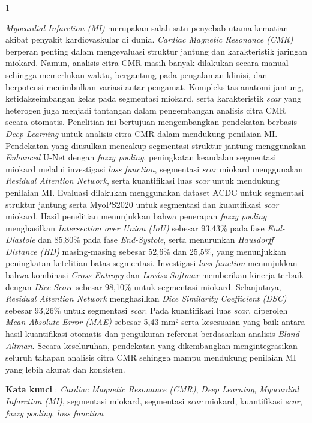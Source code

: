 \begin{spacing}{1}
	

\textit{Myocardial Infarction (MI)} merupakan salah satu penyebab utama kematian akibat penyakit kardiovaskular di dunia. \textit{Cardiac Magnetic Resonance (CMR)} berperan penting dalam mengevaluasi struktur jantung dan karakteristik jaringan miokard. Namun, analisis citra CMR masih banyak dilakukan secara manual sehingga memerlukan waktu, bergantung pada pengalaman klinisi, dan berpotensi menimbulkan variasi antar-pengamat. Kompleksitas anatomi jantung, ketidakseimbangan kelas pada segmentasi miokard, serta karakteristik \textit{scar} yang heterogen juga menjadi tantangan dalam pengembangan analisis citra CMR secara otomatis.
Penelitian ini bertujuan mengembangkan pendekatan berbasis \textit{Deep Learning} untuk analisis citra CMR dalam mendukung penilaian MI. Pendekatan yang diusulkan mencakup segmentasi struktur jantung menggunakan \textit {Enhanced} U-Net dengan \textit{fuzzy pooling}, peningkatan keandalan segmentasi miokard melalui investigasi \textit{loss function}, segmentasi \textit{scar} miokard menggunakan \textit{Residual Attention Network}, serta kuantifikasi luas \textit{scar} untuk mendukung penilaian MI. Evaluasi dilakukan menggunakan dataset ACDC untuk segmentasi struktur jantung serta MyoPS2020 untuk segmentasi dan kuantifikasi \textit{scar} miokard.
Hasil penelitian menunjukkan bahwa penerapan \textit{fuzzy pooling} menghasilkan \textit{Intersection over Union (IoU)} sebesar 93,43\% pada fase \textit{End-Diastole} dan 85,80\% pada fase \textit{End-Systole}, serta menurunkan \textit{Hausdorff Distance (HD)} masing-masing sebesar 52,6\% dan 25,5\%, yang menunjukkan peningkatan ketelitian batas segmentasi. Investigasi \textit{loss function} menunjukkan bahwa kombinasi \textit{Cross-Entropy} dan \textit{Lovász-Softmax} memberikan kinerja terbaik dengan \textit{Dice Score} sebesar 98,10\% untuk segmentasi miokard. Selanjutnya, \textit{Residual Attention Network} menghasilkan \textit{Dice Similarity Coefficient (DSC)} sebesar 93,26\% untuk segmentasi \textit{scar}. Pada kuantifikasi luas \textit{scar}, diperoleh \textit{Mean Absolute Error (MAE)} sebesar 5,43 mm² serta kesesuaian yang baik antara hasil kuantifikasi otomatis dan pengukuran referensi berdasarkan analisis \textit{Bland–Altman}. Secara keseluruhan, pendekatan yang dikembangkan mengintegrasikan seluruh tahapan analisis citra CMR sehingga mampu mendukung penilaian MI yang lebih akurat dan konsisten.


\vspace{2ex}
\textbf{Kata kunci }: \textit{Cardiac Magnetic Resonance (CMR)}, \textit{Deep Learning}, \textit{Myocardial Infarction (MI)}, segmentasi miokard, segmentasi \textit{scar} miokard, kuantifikasi \textit{scar}, \textit{fuzzy pooling}, \textit{loss function}
\end{spacing}

